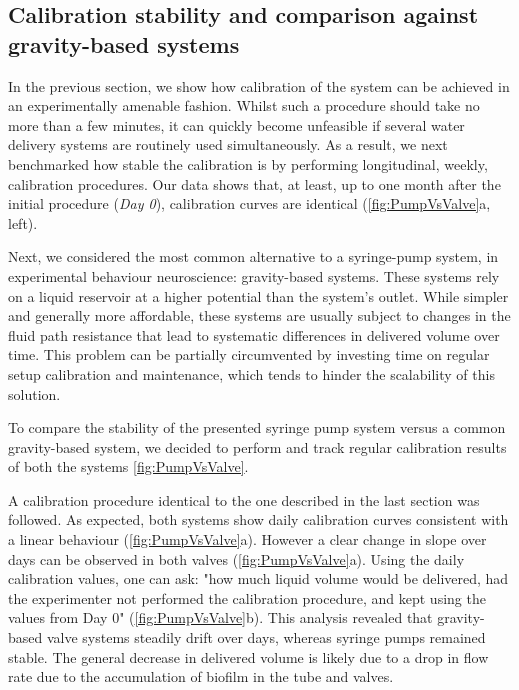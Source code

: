 \subsection*{Calibration stability and comparison against gravity-based systems}

In the previous section, we show how calibration of the system can be achieved in an experimentally amenable fashion. Whilst such a procedure should take no more than a few minutes, it can quickly become unfeasible if several water delivery systems are routinely used simultaneously. As a result, we next benchmarked how stable the calibration is by performing longitudinal, weekly, calibration procedures. Our data shows that, at least, up to one month after the initial procedure (\textit{Day 0}), calibration curves are identical (\cref{fig:PumpVsValve}a, left).

Next, we considered the most common alternative to a syringe-pump system, in experimental behaviour neuroscience: gravity-based systems. These systems rely on a liquid reservoir at a higher potential than the system's outlet. While simpler and generally more affordable, these systems are usually subject to changes in the fluid path resistance that lead to systematic differences in delivered volume over time. This problem can be partially circumvented by investing time on regular setup calibration and maintenance, which tends to hinder the scalability of this solution.

To compare the stability of the presented syringe pump system versus a common gravity-based system, we decided to perform and track regular calibration results of both the systems \cref{fig:PumpVsValve}.

A calibration procedure identical to the one described in the last section was followed. As expected, both systems show daily calibration curves consistent with a linear behaviour (\cref{fig:PumpVsValve}a). However a clear change in slope over days can be observed in both valves (\cref{fig:PumpVsValve}a). Using the daily calibration values, one can ask: "how much liquid volume would be delivered, had the experimenter not performed the calibration procedure, and kept using the values from Day 0" (\cref{fig:PumpVsValve}b). This analysis revealed that gravity-based valve systems steadily drift over days, whereas syringe pumps remained stable. The general decrease in delivered volume is likely due to a drop in flow rate due to the accumulation of biofilm in the tube and valves. 

